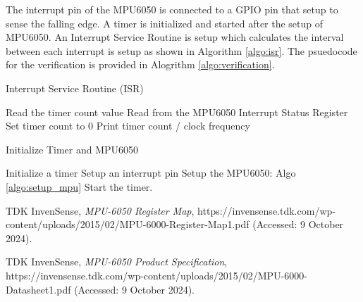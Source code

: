 \documentclass{article}
\begin{document}
	The interrupt pin of the MPU6050 is connected to a GPIO pin that setup to sense the falling edge. A timer is initialized and started after the setup of MPU6050. An Interrupt Service Routine is setup which calculates the interval between each interrupt is setup as shown in Algorithm \ref{algo:isr}. The psuedocode for the verification is provided in Alogrithm \ref{algo:verification}.
	
	 \begin{algorithm}
	 	\label{algo:isr}
	 	\caption{Interrupt Service Routine (ISR)}
	 	\begin{algorithmic}[1]
	 		\State Read the timer count value
	 		\State Read from the MPU6050 Interrupt Status Register
	 		\State Set timer count to 0
	 		\State Print timer count / clock frequency
	 	\end{algorithmic}
	 \end{algorithm}
 
	 \begin{algorithm}
	 	\label{algo:verification}
	 	\caption{Initialize Timer and MPU6050}
	 	\begin{algorithmic}[1]
	 		\State Initialize a timer
	 		\State Setup an interrupt pin
	 		\State Setup the MPU6050: Algo \ref{algo:setup_mpu}
	 		\State Start the timer.
	 	\end{algorithmic}
	 \end{algorithm}
	 

 
	\begin{thebibliography}{9}
		TDK InvenSense,
		\textit{MPU-6050 Register Map}, {https://invensense.tdk.com/wp-content/uploads/2015/02/MPU-6000-Register-Map1.pdf} (Accessed: 9 October 2024).
		
		TDK InvenSense,
		\textit{MPU-6050 Product Specification}, {https://invensense.tdk.com/wp-content/uploads/2015/02/MPU-6000-Datasheet1.pdf} (Accessed: 9 October 2024).
		
	\end{thebibliography}
\end{document}
